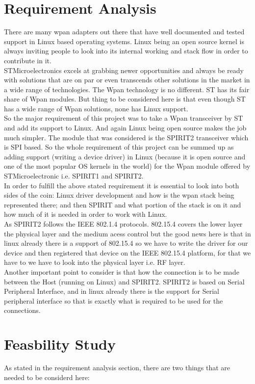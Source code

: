 \section{Requirement Analysis}
There are many wpan adapters out there that have well documented and tested support in Linux based operating systems. Linux being an open source kernel is always inviting people to look into its internal working and stack flow in order to contribute in it.\\
STMicroelectronics excels at grabbing newer opportunities and always be ready with solutions that are on par or even transcends other solutions in the market in a wide range of technologies. The Wpan technology is no different. ST has its fair share of Wpan modules. But thing to be considered here is that even though ST has a wide range of Wpan solutions, none has Linux support.\\ 
So the major requirement of this project was to take a Wpan transceiver by ST and add its support to Linux. And again Linux being open source makes the job much simpler. The module that was considered is the SPIRIT2 transceiver which is SPI based. So the whole requirement of this project can be summed up as adding support (writing a device driver) in Linux (because it is open source and one of the most popular OS kernels in the world) for the Wpan module offered by STMicroelectronic i.e. SPIRIT1 and SPIRIT2.\\
In order to fulfill the above stated requirement it is essential to look into both sides of the coin: Linux driver development and how is the wpan stack being represented there; and then SPIRIT and what portion of the stack is on it and how much of it is needed in order to work with Linux.\\
As SPIRIT2 follows the IEEE 802.1.4 protocols. 802.15.4 covers the lower layer the physical layer and the medium acess control but the good news here is that in linux already there is a support of 802.15.4 so we have to write the driver for our device and then registered that device on the IEEE 802.15.4 platform, for that we have to we have to look into the physical layer i.e. RF layer.\\ 
Another important point to consider is that how the connection is to be made between the Host (running on Linux) and SPIRIT2. SPIRIT2 is based on Serial Peripheral Interface, and in linux already there is the support for Serial peripheral interface so that is exactly what is required to be used for the connections. 
\section{Feasbility Study}
As stated in the requirement analysis section, there are two things that are needed to be considerd here:
